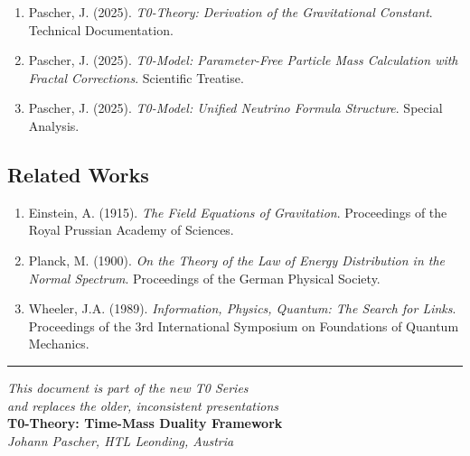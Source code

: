\documentclass[12pt,a4paper]{article}
\begin{document}
	\begin{enumerate}
		\item Pascher, J. (2025). \textit{T0-Theory: Derivation of the Gravitational Constant}. Technical Documentation.
		\item Pascher, J. (2025). \textit{T0-Model: Parameter-Free Particle Mass Calculation with Fractal Corrections}. Scientific Treatise.
		\item Pascher, J. (2025). \textit{T0-Model: Unified Neutrino Formula Structure}. Special Analysis.
	\end{enumerate}
	
	\subsection{Related Works}
	
	\begin{enumerate}
		\item Einstein, A. (1915). \textit{The Field Equations of Gravitation}. Proceedings of the Royal Prussian Academy of Sciences.
		\item Planck, M. (1900). \textit{On the Theory of the Law of Energy Distribution in the Normal Spectrum}. Proceedings of the German Physical Society.
		\item Wheeler, J.A. (1989). \textit{Information, Physics, Quantum: The Search for Links}. Proceedings of the 3rd International Symposium on Foundations of Quantum Mechanics.
	\end{enumerate}
	
	\begin{center}
		\hrule
		\vspace{0.5cm}
		\textit{This document is part of the new T0 Series}\\
		\textit{and replaces the older, inconsistent presentations}\\
		\vspace{0.3cm}
		\textbf{T0-Theory: Time-Mass Duality Framework}\\
		\textit{Johann Pascher, HTL Leonding, Austria}\\
	\end{center}
	
\end{document}
